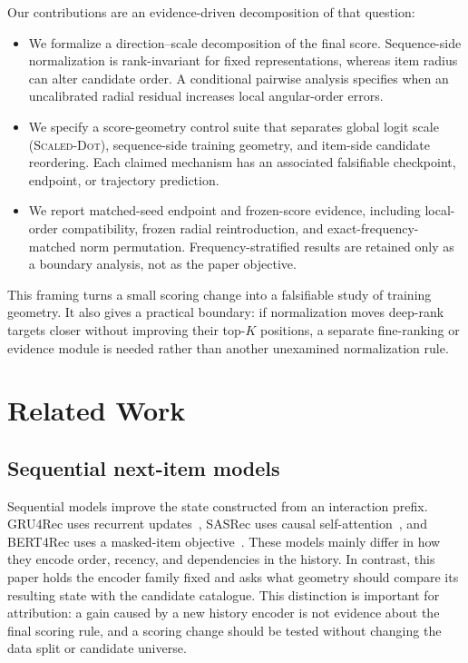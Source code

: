 \documentclass[sigconf,anonymous,review]{acmart}
\newcommand{\scaledot}{\textsc{Scaled-Dot}}
\begin{document}
Our contributions are an evidence-driven decomposition of that question:
\begin{itemize}[leftmargin=*,noitemsep,topsep=2pt]
\item We formalize a direction--scale decomposition of the final score. Sequence-side normalization is rank-invariant for fixed representations, whereas item radius can alter candidate order. A conditional pairwise analysis specifies when an uncalibrated radial residual increases local angular-order errors.
\item We specify a score-geometry control suite that separates global logit scale (\scaledot{}), sequence-side training geometry, and item-side candidate reordering. Each claimed mechanism has an associated falsifiable checkpoint, endpoint, or trajectory prediction.
\item We report matched-seed endpoint and frozen-score evidence, including local-order compatibility, frozen radial reintroduction, and exact-frequency-matched norm permutation. Frequency-stratified results are retained only as a boundary analysis, not as the paper objective.
\end{itemize}

This framing turns a small scoring change into a falsifiable study of training geometry. It also gives a practical boundary: if normalization moves deep-rank targets closer without improving their top-$K$ positions, a separate fine-ranking or evidence module is needed rather than another unexamined normalization rule.

\section{Related Work}
\subsection{Sequential next-item models}
Sequential models improve the state constructed from an interaction prefix. GRU4Rec uses recurrent updates~\cite{hidasi2016gru4rec}, SASRec uses causal self-attention~\cite{kang2018sasrec}, and BERT4Rec uses a masked-item objective~\cite{sun2019bert4rec}. These models mainly differ in how they encode order, recency, and dependencies in the history. In contrast, this paper holds the encoder family fixed and asks what geometry should compare its resulting state with the candidate catalogue. This distinction is important for attribution: a gain caused by a new history encoder is not evidence about the final scoring rule, and a scoring change should be tested without changing the data split or candidate universe.
\end{document}
